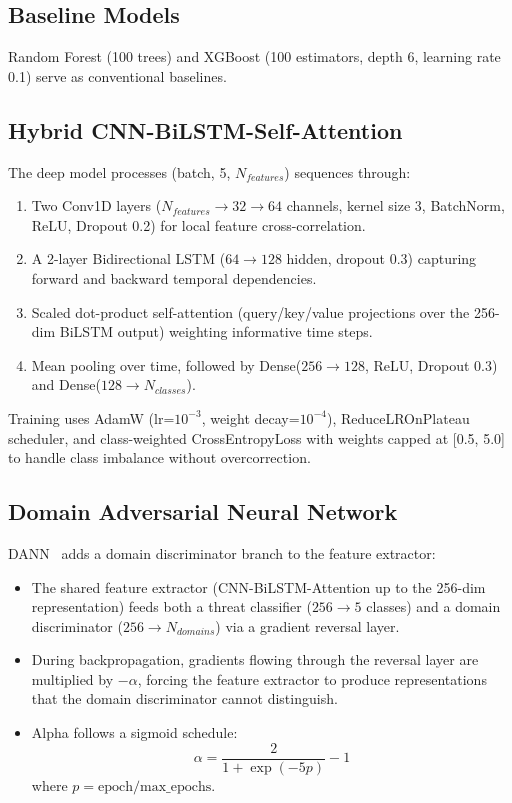 \documentclass[conference]{IEEEtran}
\begin{document}
\subsection{Baseline Models}

Random Forest (100 trees) and XGBoost (100 estimators, depth 6, learning rate 0.1) serve as conventional baselines.

\subsection{Hybrid CNN-BiLSTM-Self-Attention}

The deep model processes (batch, 5, $N_{features}$) sequences through:

\begin{enumerate}
\item Two Conv1D layers ($N_{features} \rightarrow 32 \rightarrow 64$ channels, kernel size 3, BatchNorm, ReLU, Dropout 0.2) for local feature cross-correlation.
\item A 2-layer Bidirectional LSTM ($64 \rightarrow 128$ hidden, dropout 0.3) capturing forward and backward temporal dependencies.
\item Scaled dot-product self-attention (query/key/value projections over the 256-dim BiLSTM output) weighting informative time steps.
\item Mean pooling over time, followed by Dense($256 \rightarrow 128$, ReLU, Dropout 0.3) and Dense($128 \rightarrow N_{classes}$).
\end{enumerate}

Training uses AdamW (lr=$10^{-3}$, weight decay=$10^{-4}$), ReduceLROnPlateau scheduler, and class-weighted CrossEntropyLoss with weights capped at [0.5, 5.0] to handle class imbalance without overcorrection.

\subsection{Domain Adversarial Neural Network}

DANN~\cite{ganin2016domain} adds a domain discriminator branch to the feature extractor:

\begin{itemize}
\item The shared feature extractor (CNN-BiLSTM-Attention up to the 256-dim representation) feeds both a threat classifier ($256 \rightarrow 5$ classes) and a domain discriminator ($256 \rightarrow N_{domains}$) via a gradient reversal layer.
\item During backpropagation, gradients flowing through the reversal layer are multiplied by $-\alpha$, forcing the feature extractor to produce representations that the domain discriminator cannot distinguish.
\item Alpha follows a sigmoid schedule:
\begin{equation}
\alpha = \frac{2}{1 + \exp(-5p)} - 1
\end{equation}
where $p = \text{epoch}/\text{max\_epochs}$.
\end{itemize}
\end{document}

